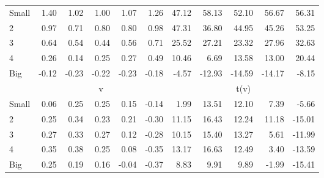 \begin{table}[!ht]
\begin{tabular}{lrrrrrrrrrr}
    \\
      \cmidrule(r){2-6} \cmidrule(r){7-11}

    Small   & 1.40  & 1.02  & 1.00  & 1.07  & 1.26  & 47.12  & 58.13  & 52.10  & 56.67  & 56.31  \\
         2  & 0.97  & 0.71  & 0.80  & 0.80  & 0.98  & 47.31  & 36.80  & 44.95  & 45.26  & 53.25  \\
         3  & 0.64  & 0.54  & 0.44  & 0.56  & 0.71  & 25.52  & 27.21  & 23.32  & 27.96  & 32.63  \\
         4  & 0.26  & 0.14  & 0.25  & 0.27  & 0.49  & 10.46  & 6.69  & 13.58  & 13.00  & 20.44  \\
    Big     & -0.12  & -0.23  & -0.22  & -0.23  & -0.18  & -4.57  & -12.93  & -14.59  & -14.17  & -8.15  \\

  
    
      & \multicolumn{5}{c}{v} & \multicolumn{5}{c}{t(v)}
    
    \\
      \cmidrule(r){2-6} \cmidrule(r){7-11}

    Small   & 0.06  & 0.25  & 0.25  & 0.15  & -0.14  & 1.99  & 13.51  & 12.10  & 7.39  & -5.66  \\
         2  & 0.25  & 0.34  & 0.23  & 0.21  & -0.30  & 11.15  & 16.43  & 12.24  & 11.18  & -15.01  \\
         3  & 0.27  & 0.33  & 0.27  & 0.12  & -0.28  & 10.15  & 15.40  & 13.27  & 5.61  & -11.99  \\
         4  & 0.35  & 0.38  & 0.25  & 0.08  & -0.35  & 13.17  & 16.63  & 12.49  & 3.40  & -13.59  \\
    Big     & 0.25  & 0.19  & 0.16  & -0.04  & -0.37  & 8.83  & 9.91  & 9.89  & -1.99  & -15.41  \\

  

  \bottomrule
\end{tabular}
\label{tbl:25_Size_Inv_FF1993}
\end{table}